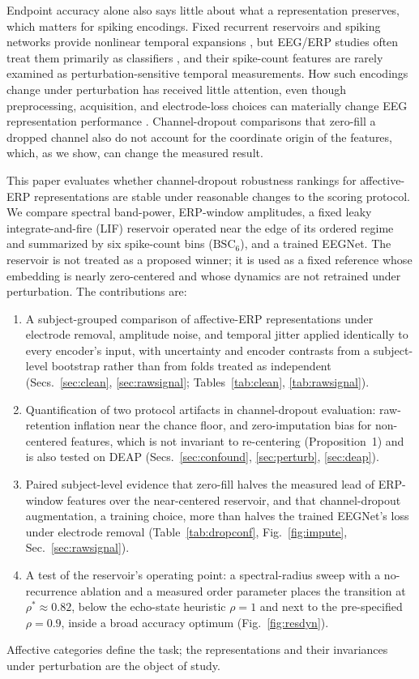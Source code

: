 \documentclass[conference]{IEEEtran}
\newcommand{\BSC}{\ensuremath{\mathrm{BSC}_{6}}}
\begin{document}
Endpoint accuracy alone also says little about what a representation preserves, which matters for spiking encodings. Fixed recurrent reservoirs and spiking networks provide nonlinear temporal expansions \cite{maass2002real,lukosevicius2009reservoir}, but EEG/ERP studies often treat them primarily as classifiers \cite{gong2023sglnet,craik2019deep}, and their spike-count features are rarely examined as perturbation-sensitive temporal measurements. How such encodings change under perturbation has received little attention, even though preprocessing, acquisition, and electrode-loss choices can materially change EEG representation performance \cite{delpup2025preprocessing,chiang2023depression,guo2025mma}. Channel-dropout comparisons that zero-fill a dropped channel also do not account for the coordinate origin of the features, which, as we show, can change the measured result.

This paper evaluates whether channel-dropout robustness rankings for affective-ERP representations are stable under reasonable changes to the scoring protocol. We compare spectral band-power, ERP-window amplitudes, a fixed leaky integrate-and-fire (LIF) reservoir operated near the edge of its ordered regime and summarized by six spike-count bins (\BSC{}), and a trained EEGNet. The reservoir is not treated as a proposed winner; it is used as a fixed reference whose embedding is nearly zero-centered and whose dynamics are not retrained under perturbation. The contributions are:
\begin{enumerate}
    \item A subject-grouped comparison of affective-ERP representations under electrode removal, amplitude noise, and temporal jitter applied identically to every encoder's input, with uncertainty and encoder contrasts from a subject-level bootstrap rather than from folds treated as independent (Secs.~\ref{sec:clean}, \ref{sec:rawsignal}; Tables~\ref{tab:clean}, \ref{tab:rawsignal}).
    \item Quantification of two protocol artifacts in channel-dropout evaluation: raw-retention inflation near the chance floor, and zero-imputation bias for non-centered features, which is not invariant to re-centering (Proposition~1) and is also tested on DEAP (Secs.~\ref{sec:confound}, \ref{sec:perturb}, \ref{sec:deap}).
    \item Paired subject-level evidence that zero-fill halves the measured lead of ERP-window features over the near-centered reservoir, and that channel-dropout augmentation, a training choice, more than halves the trained EEGNet's loss under electrode removal (Table~\ref{tab:dropconf}, Fig.~\ref{fig:impute}, Sec.~\ref{sec:rawsignal}).
    \item A test of the reservoir's operating point: a spectral-radius sweep with a no-recurrence ablation and a measured order parameter places the transition at $\rho^\ast\approx0.82$, below the echo-state heuristic $\rho=1$ and next to the pre-specified $\rho=0.9$, inside a broad accuracy optimum (Fig.~\ref{fig:resdyn}).
\end{enumerate}
Affective categories define the task; the representations and their invariances under perturbation are the object of study.
\end{document}
